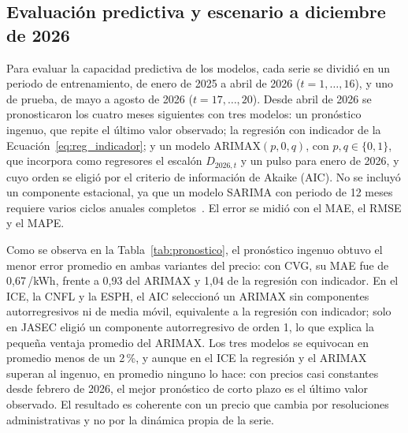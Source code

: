 \documentclass[conference]{IEEEtran}
\newcommand{\crc}{\textcolonmonetary} %
\begin{document}
\subsection{Evaluaci\'on predictiva y escenario a diciembre de 2026}
\label{sec:pronostico}

Para evaluar la capacidad predictiva de los modelos, cada serie se dividi\'o en un periodo de entrenamiento, de enero de 2025 a abril de 2026 ($t = 1, \dots, 16$), y uno de prueba, de mayo a agosto de 2026 ($t = 17, \dots, 20$). Desde abril de 2026 se pronosticaron los cuatro meses siguientes con tres modelos: un pron\'ostico ingenuo, que repite el \'ultimo valor observado; la regresi\'on con indicador de la Ecuaci\'on~\eqref{eq:reg_indicador}; y un modelo ARIMAX$(p,0,q)$, con $p, q \in \{0,1\}$, que incorpora como regresores el escal\'on $D_{2026,t}$ y un pulso para enero de 2026, y cuyo orden se eligi\'o por el criterio de informaci\'on de Akaike (AIC). No se incluy\'o un componente estacional, ya que un modelo SARIMA con periodo de 12 meses requiere varios ciclos anuales completos~\cite{r13}. El error se midi\'o con el MAE, el RMSE y el MAPE.

Como se observa en la Tabla~\ref{tab:pronostico}, el pron\'ostico ingenuo obtuvo el menor error promedio en ambas variantes del precio: con CVG, su MAE fue de 0,67\,\crc/kWh, frente a 0,93 del ARIMAX y 1,04 de la regresi\'on con indicador. En el ICE, la CNFL y la ESPH, el AIC seleccion\'o un ARIMAX sin componentes autorregresivos ni de media m\'ovil, equivalente a la regresi\'on con indicador; solo en JASEC eligi\'o un componente autorregresivo de orden 1, lo que explica la peque\~na ventaja promedio del ARIMAX. Los tres modelos se equivocan en promedio menos de un 2\,\%, y aunque en el ICE la regresi\'on y el ARIMAX superan al ingenuo, en promedio ninguno lo hace: con precios casi constantes desde febrero de 2026, el mejor pron\'ostico de corto plazo es el \'ultimo valor observado. El resultado es coherente con un precio que cambia por resoluciones administrativas y no por la din\'amica propia de la serie.
\end{document}
